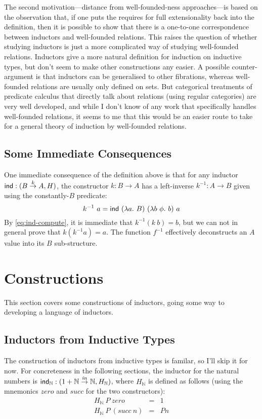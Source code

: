 \documentclass{article}
\newcommand{\inn}{\mathit{in}}
\newcommand{\cons}[1]{\mathit{#1}}
\begin{document}
The second motivation---distance from well-founded-ness
approaches---is based on the observation that, if one puts the
requires for full extensionality back into the definition, then it is
possible to show that there is a one-to-one correspondence between
inductors and well-founded relations. This raises the question of
whether studying inductors is just a more complicated way of studying
well-founded relations. Inductors give a more natural definition for
induction on inductive types, but don't seem to make other
constructions any easier. A possible counter-argument is that
inductors can be generalised to other fibrations, whereas well-founded
relations are usually only defined on sets. But categorical treatments
of predicate calculus that directly talk about relations (using
regular categories) are very well developed, and while I don't know of
any work that specifically handles well-founded relations, it seems to
me that this would be an easier route to take for a general theory of
induction by well-founded relations.

\subsection{Some Immediate Consequences}

One immediate consequence of the definition above is that for any
inductor $\mathsf{ind} : (B \stackrel{k}\to A, H)$, the constructor $k : B \to
A$ has a left-inverse $k^{-1} : A \to B$ given using the
constantly-$B$ predicate:
\begin{displaymath}
  k^{-1}\ a = \ind\ (\lambda a.\ B)\ (\lambda b\ \phi.\ b)\ a
\end{displaymath}
By \autoref{eq:ind-compute}, it is immediate that $k^{-1} (k\ b) = b$,
but we can not in general prove that $k (k^{-1} a) = a$. The function
$f^{-1}$ effectively deconstructs an $A$ value into its $B$
sub-structure.

\section{Constructions}

This section covers some constructions of inductors, going some way to
developing a language of inductors.

\subsection{Inductors from Inductive Types}

The construction of inductors from inductive types is familar, so I'll
skip it for now. For concreteness in the following sections, the
inductor for the natural numbers is $\ind_{\mathbb{N}} : (1 +
\mathbb{N} \stackrel{\inn}\to \mathbb{N}, H_{\mathbb{N}})$, where
$H_{\mathbb{N}}$ is defined as follows (using the mnemonics
$\cons{zero}$ and $\cons{succ}$ for the two constructors):
\begin{eqnarray*}
  H_{\mathbb{N}}\ P\ \mathit{zero} & = & 1 \\
  H_{\mathbb{N}}\ P\ (\mathit{succ}\ n) & = & P n
\end{eqnarray*}
\end{document}
